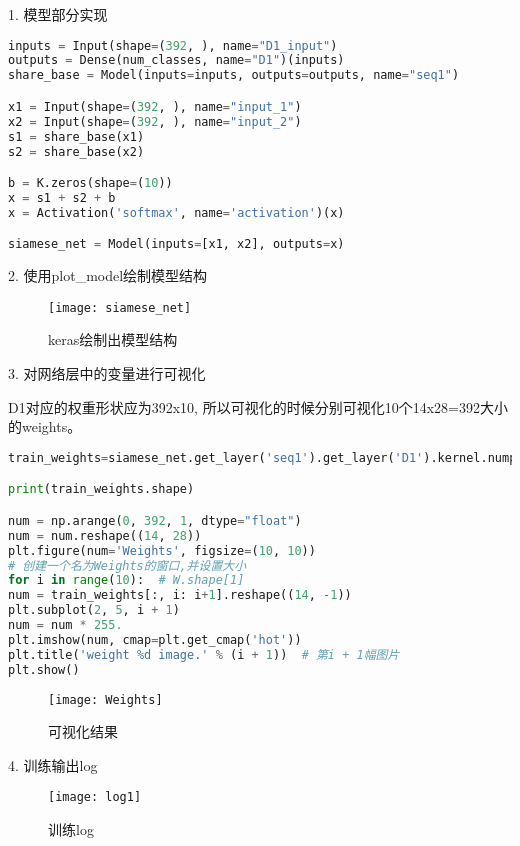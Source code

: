 \documentclass{article}
\begin{document}
	1. 模型部分实现
	
\begin{lstlisting}[language=Python]
inputs = Input(shape=(392, ), name="D1_input")
outputs = Dense(num_classes, name="D1")(inputs)
share_base = Model(inputs=inputs, outputs=outputs, name="seq1")

x1 = Input(shape=(392, ), name="input_1")
x2 = Input(shape=(392, ), name="input_2")
s1 = share_base(x1)
s2 = share_base(x2)

b = K.zeros(shape=(10))
x = s1 + s2 + b
x = Activation('softmax', name='activation')(x)

siamese_net = Model(inputs=[x1, x2], outputs=x)
\end{lstlisting}

	2. 使用plot\_model绘制模型结构
    
    \begin{figure}[H]
    	\centering
    	\texttt{[image: siamese\_net]}
    	\caption{keras绘制出模型结构}
    	\label{fig:siamesenet}
    \end{figure}
    
    3. 对网络层中的变量进行可视化
    
    D1对应的权重形状应为392x10, 所以可视化的时候分别可视化10个14x28=392大小的weights。
    
    
\begin{lstlisting}[language=Python]
train_weights=siamese_net.get_layer('seq1').get_layer('D1').kernel.numpy()

print(train_weights.shape)

num = np.arange(0, 392, 1, dtype="float")
num = num.reshape((14, 28))
plt.figure(num='Weights', figsize=(10, 10))  
# 创建一个名为Weights的窗口,并设置大小
for i in range(10):  # W.shape[1]
num = train_weights[:, i: i+1].reshape((14, -1))
plt.subplot(2, 5, i + 1)
num = num * 255.
plt.imshow(num, cmap=plt.get_cmap('hot'))
plt.title('weight %d image.' % (i + 1))  # 第i + 1幅图片
plt.show()
\end{lstlisting}
    
    \begin{figure}[H]
    	\centering
    	\texttt{[image: Weights]}
    	\caption{可视化结果}
    	\label{fig:weights}
    \end{figure}
    
    
    4. 训练输出log
    
    
    \begin{figure}[H]
    	\centering
    	\texttt{[image: log1]}
    	\caption{训练log}

    	\label{fig:log1}
    \end{figure}
    
\end{document}
